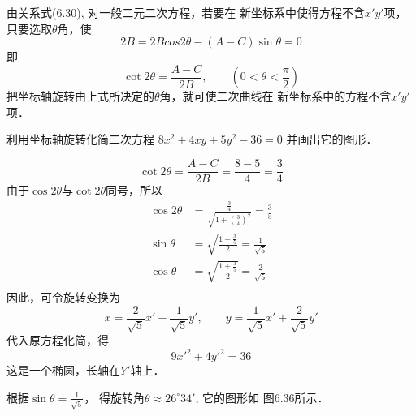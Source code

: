 由关系式(6.30), 对一般二元二次方程，若要在
新坐标系中使得方程不含$x'y'$项，只要选取$\theta$角，使
\[2B=2Bcos2\theta -(A-C)\sin\theta=0\]
即
\[\cot 2\theta=\frac{A-C}{2B},\qquad \left(0<\theta<\frac{\pi}{2}\right)\]
把坐标轴旋转由上式所决定的$\theta$角，就可使二次曲线在
新坐标系中的方程不含$x'y'$项．

\begin{example}
    利用坐标轴旋转化简二次方程
$8x^2+4xy+5y^2-36=0$
并画出它的图形．
\end{example}

\begin{solution}
\[\cot 2\theta=\frac{A-C}{2B}=\frac{8-5}{4}=\frac{3}{4}\]
由于$\cos2\theta$与$\cot2\theta$同号，所以
\[\begin{split}
    \cos2\theta&=\frac{\frac{3}{4}}{\sqrt{1+\left(\frac{3}{4}\right)^2}}=\frac{3}{5}\\
    \sin\theta&=\sqrt{\frac{1-\frac{3}{5}}{2}}=\frac{1}{\sqrt{5}}\\
    \cos\theta&=\sqrt{\frac{1+\frac{3}{5}}{2}}=\frac{2}{\sqrt{5}}\\
\end{split}\]
因此，可令旋转变换为
\[x=\frac{2}{\sqrt{5}}x'-\frac{1}{\sqrt{5}}y',\qquad y=\frac{1}{\sqrt{5}}x'+\frac{2}{\sqrt{5}}y'\]
代入原方程化简，得
\[9{x'}^2+4{y'}^2=36\]
这是一个椭圆，长轴在$Y'$轴上．

根据$\sin\theta=\frac{1}{\sqrt{5}}$，
得旋转角$\theta\approx 26^{\circ}34'$, 它的图形如
图6.36所示．
\end{solution}

\begin{figure}[htp]
    \centering
    \caption{}
\end{figure}

